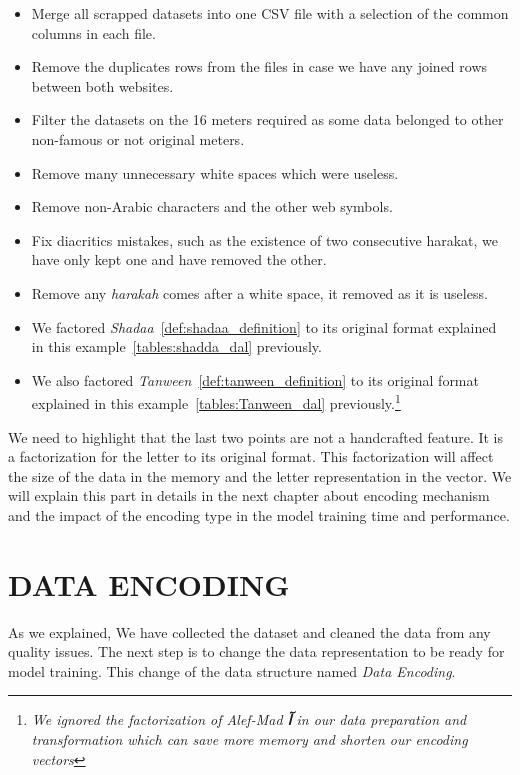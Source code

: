\begin{itemize}
\item Merge all scrapped datasets into one CSV file with a selection of the common columns in each file.
\item Remove the duplicates rows from the files in case we have any joined rows between both websites.
\item Filter the datasets on the 16 meters required as some data belonged to other non-famous or not original meters.
\item Remove many unnecessary white spaces which were useless.
\item Remove non-Arabic characters and the other web symbols.
\item Fix diacritics mistakes, such as the existence of two consecutive harakat, we have only kept one and have removed the other. %
\item Remove any \textit{harakah} comes after a white space, it removed as it is useless. %
\item We factored \textit{Shadaa}~\ref{def:shadaa_definition} to its original format explained in this example~\ref{tables:shadda_dal} previously.
\item We also factored \textit{Tanween}~\ref{def:tanween_definition} to its original format explained in this example~\ref{tables:Tanween_dal} previously.\footnote{\textit{We ignored the factorization of Alef-Mad  \textbf{\textarabic{ آ }} in our data preparation and transformation which can save more memory and shorten our encoding vectors}}
\end{itemize}

We need to highlight that the last two points are not a handcrafted feature. It is a factorization for the letter to its original format. This factorization will affect the size of the data in the memory and the letter representation in the vector. We will explain this part in details in the next chapter about encoding mechanism and the impact of the encoding type in the model training time and performance.

\section{\uppercase{Data Encoding}}\label{ch:data_encoding}

As we explained, We have collected the dataset and cleaned the data from any quality issues. The next step is to change the data representation to be ready for model training. This change of the data structure named \textit{Data Encoding}.

